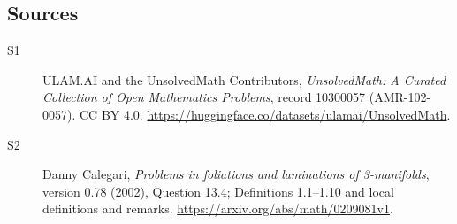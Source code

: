 \documentclass[11pt]{article}
\begin{document}
\subsection{Sources}
\begin{description}
\item[\hypertarget{source:10300057:1}{S1}] ULAM.AI and the UnsolvedMath Contributors, \emph{UnsolvedMath: A Curated Collection of Open Mathematics Problems}, record 10300057 (AMR-102-0057). CC BY 4.0. \url{https://huggingface.co/datasets/ulamai/UnsolvedMath}.
\item[\hypertarget{source:10300057:2}{S2}] Danny Calegari, \emph{Problems in foliations and laminations of 3-manifolds}, version 0.78 (2002), Question 13.4; Definitions 1.1--1.10 and local definitions and remarks. \url{https://arxiv.org/abs/math/0209081v1}.
\end{description}
\label{end:10300057}
\end{document}
